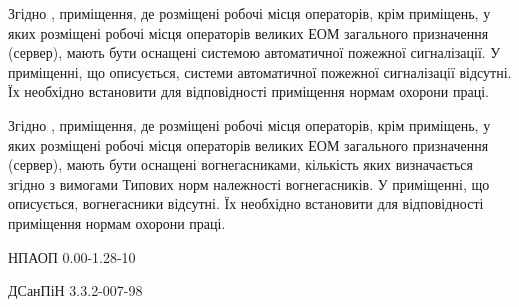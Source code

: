 \documentclass[a4paper,12pt]{article}
\begin{document}
Згідно \cite{npaop1210}, приміщення, де розміщені робочі місця операторів, крім приміщень, у яких розміщені робочі місця операторів великих ЕОМ загального призначення (сервер), мають бути оснащені системою автоматичної пожежної сигналізації. У приміщенні, що описується, системи автоматичної пожежної сигналізації відсутні. Їх необхідно встановити для відповідності приміщення нормам охорони праці.

Згідно \cite{npaop1210}, приміщення, де розміщені робочі місця операторів, крім приміщень, у яких розміщені робочі місця операторів великих ЕОМ загального призначення (сервер), мають бути оснащені вогнегасниками, кількість яких визначається згідно з вимогами Типових норм належності вогнегасників. У приміщенні, що описується, вогнегасники відсутні. Їх необхідно встановити для відповідності приміщення нормам охорони праці.



\begin{thebibliography}{9}

	НПАОП 0.00-1.28-10
	
	ДСанПіН  3.3.2-007-98


\end{thebibliography}
\end{document}

